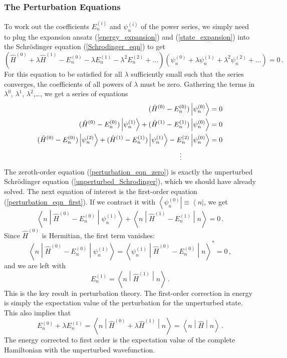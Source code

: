 \documentclass{article}
\theoremstyle{plain}\theoremheaderfont{\normalfont\itshape}\theorembodyfont{\rmfamily}\theoremseparator{.}\newtheorem*{rem}{Remark}\newtheorem*{ex}{Example}\newtheorem*{proof}{Proof}\newtheorem*{altp}{Alternative proof}
\theoremstyle{plain}\theoremheaderfont{\normalfont\bfseries}\theorembodyfont{\rmfamily}\theoremseparator{.}\newtheorem{thm}{Theorem}[section]\newtheorem{lem}[thm]{Lemma}\newtheorem{prop}[thm]{Proposition}\newtheorem*{cor}{Corollary}\newtheorem{defn}[thm]{Definition}\newtheorem{clm}[thm]{Claim}\newtheorem{clminproof}{Claim}
\theoremstyle{break}\theoremheaderfont{\normalfont\itshape}\theorembodyfont{\rmfamily}\theoremseparator{.\medskip}\newtheorem*{proofskip}{Proof}\newtheorem*{exs}{Examples}\newtheorem*{rems}{Remarks}
\theoremstyle{break}\theoremheaderfont{\normalfont\bfseries}\theorembodyfont{\rmfamily}\theoremseparator{.\medskip}\newtheorem{lemskip}[thm]{Lemma}\newtheorem{defnskip}[thm]{Definition}\newtheorem{propskip}[thm]{Proposition}\newtheorem{thmskip}[thm]{Theorem}
\numberwithin{equation}{section}
\newcommand{\bra}[1]{\left\langle #1 \right|}
\newcommand{\ket}[1]{\left| #1 \right\rangle}
\newcommand{\mel}[3]{\left\langle #1 \middle| #2 \middle| #3 \right\rangle}
\newcommand{\expval}[2]{\left\langle #2 \middle| #1 \middle| #2 \right\rangle}
\begin{document}
    \subsubsection{The Perturbation Equations}
    To work out the coefficients \(E_n^{(i)}\) and \(\psi_n^{(i)}\) of the power series, we simply need to plug the expansion ansatz (\ref{energy_expansion}) and (\ref{state_expansion}) into the Schr\"{o}dinger equation (\ref{Schrodinger_eqn}) to get
    \begin{equation}\label{perturbed_Schrodinger}
        (\hat{H}^{(0)}+\lambda\hat{H}^{(1)}-E_n^{(0)}-\lambda E_n^{(1)}-\lambda^2 E_n^{(2)}+\dots)(\psi_n^{(0)}+\lambda\psi_n^{(1)}+\lambda^2\psi_n^{(2)}+\dots)=0\,.
    \end{equation}
    For this equation to be satisfied for all \(\lambda\) sufficiently small such that the series converges, the coefficients of all powers of \(\lambda\) must be zero. Gathering the terms in \(\lambda^0\), \(\lambda^1\), \(\lambda^2\),\dots, we get a series of equations
    \begin{align}
        (\hat{H}^{(0)}-E_n^{(0)})\ket{\psi_n^{(0)}}&=0\label{perturbation_eqn_zero}\\
        (\hat{H}^{(0)}-E_n^{(0)})\ket{\psi_n^{(1)}}+(\hat{H}^{(1)}-E_n^{(1)})\ket{\psi_n^{(0)}}&=0\label{perturbation_eqn_first}\\
        (\hat{H}^{(0)}-E_n^{(0)})\ket{\psi_n^{(2)}}+(\hat{H}^{(1)}-E_n^{(1)})\ket{\psi_n^{(1)}}-E_n^{(2)}\ket{\psi_n^{(0)}}&=0\label{perturbation_eqn_second}\\
        \vdots\qquad\qquad&\notag
    \end{align}
    The zeroth-order equation (\ref{perturbation_eqn_zero}) is exactly the unperturbed Schr\"{o}dinger equation (\ref{unperturbed_Schrodinger}), which we should have already solved. The next equation of interest is the first-order equation (\ref{perturbation_eqn_first}). If we contract it with \(\bra{\psi_n^{(0)}}\equiv\bra{n}\), we get
    \begin{equation}
        \mel{n}{\hat{H}^{(0)}-E_n^{(0)}}{\psi_n^{(1)}}+\expval{\hat{H}^{(1)}-E_n^{(1)}}{n}=0\,.
    \end{equation}
    Since \(\hat{H}^{(0)}\) is Hermitian, the first term vanishes:
    \begin{equation}
        \mel{n}{\hat{H}^{(0)}-E_n^{(0)}}{\psi_n^{(1)}}=\mel{\psi_n^{(1)}}{\hat{H}^{(0)}-E_n^{(0)}}{n}^*=0\,,
    \end{equation}
    and we are left with
    \begin{equation}\label{first_order_energy}
        E_n^{(1)}=\expval{\hat{H}^{(1)}}{n}\,.
    \end{equation}
    This is the key result in perturbation theory. The first-order correction in energy is simply the expectation value of the perturbation for the unperturbed state. This also implies that
    \begin{equation}
        E_n^{(0)}+\lambda E_n^{(1)}=\expval{\hat{H}^{(0)}+\lambda\hat{H}^{(1)}}{n}=\expval{\hat{H}}{n}\,.
    \end{equation}
    The energy corrected to first order is the expectation value of the complete Hamiltonian with the unperturbed wavefunction.
\end{document}
